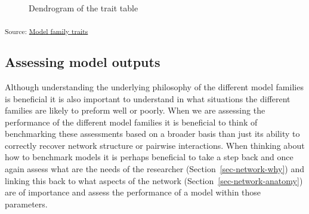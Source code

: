 \documentclass[
]{article}
\begin{document}
\begin{figure}[H]


\caption{\label{fig-dendo}Dendrogram of the trait table}

\end{figure}%

\textsubscript{Source:
\href{https://BecksLab.github.io/ms_t_is_for_topology/notebooks/model_qualitative-preview.html\#cell-fig-dendo}{Model
family traits}}

\subsection{Assessing model outputs}\label{assessing-model-outputs}

Although understanding the underlying philosophy of the different model
families is beneficial it is also important to understand in what
situations the different families are likely to preform well or poorly.
When we are assessing the performance of the different model families it
is beneficial to think of benchmarking these assessments based on a
broader basis than just its ability to correctly recover network
structure or pairwise interactions. When thinking about how to benchmark
models it is perhaps beneficial to take a step back and once again
assess what are the needs of the researcher
(Section~\ref{sec-network-why}) and linking this back to what aspects of
the network (Section~\ref{sec-network-anatomy}) are of importance and
assess the performance of a model within those parameters.
\end{document}
